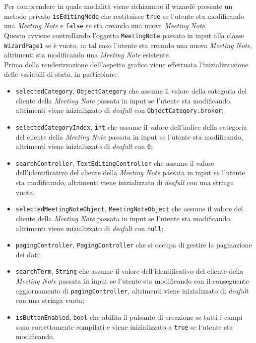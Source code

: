Per comprendere in quale modalità viene richiamato il \gls{wizard}\glsoccur è presente un metodo privato \lstinline{isEditingMode} che restituisce \lstinline{true} se l'utente sta modificando una \emph{Meeting Note} e \lstinline{false} se sta creando una nuova \emph{Meeting Note}. \\
Questo avviene controllando l'oggetto \lstinline{MeetingNote} passato in input alla classe \lstinline{WizardPage1} se è vuoto, in tal caso l'utente sta creando una nuova \emph{Meeting Note}, altrimenti sta modificando una \emph{Meeting Note} esistente. \\
Prima della renderizzazione dell'aspetto grafico viene effettuata l'inizializzazione delle variabili di stato, in particolare:
\begin{itemize}
    \item \lstinline{selectedCategory}, \lstinline{ObjectCategory} che assume il valore della categoria del cliente della \emph{Meeting Note} passata in input se l'utente sta modificando, altrimenti viene inizializzato di \emph{deafult} con \lstinline{ObjectCategory.broker};
    \item \lstinline{selectedCategoryIndex}, \lstinline{int} che assume il valore dell'indice della categoria del cliente della \emph{Meeting Note} passata in input se l'utente sta modificando, altrimenti viene inizializzato di \emph{deafult} con \lstinline{0};
    \item \lstinline{searchController}, \lstinline{TextEditingController} che assume il valore dell'identificativo del cliente della \emph{Meeting Note} passata in input se l'utente sta modificando, altrimenti viene inizializzato di \emph{deafult} con una stringa vuota;
    \item \lstinline{selectedMeetingNoteObject}, \lstinline{MeetingNoteObject} che assume il valore del cliente della \emph{Meeting Note} passata in input se l'utente sta modificando, altrimenti viene inizializzato di \emph{deafult} con \lstinline{null};
    \item \lstinline{pagingController}, \lstinline{PagingController} che si occupa di gestire la paginazione dei dati;
    \item \lstinline{searchTerm}, \lstinline{String} che assume il valore dell'identificativo del cliente della \emph{Meeting Note} passata in input se l'utente sta modificando con il conseguente aggiornamento di \lstinline{pagingController}, altrimenti viene inizializzato di \emph{deafult} con una stringa vuota;
    \item \lstinline{isButtonEnabled}, \lstinline{bool} che abilita il pulsante di creazione se tutti i campi sono correttamente compilati e viene inizializzato a \lstinline{true} se l'utente sta modificando.
\end{itemize}
